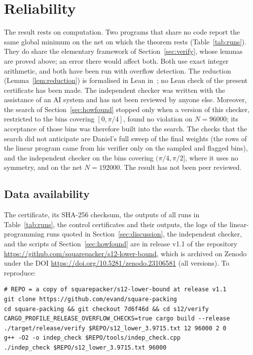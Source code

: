\documentclass[11pt]{amsart}
\theoremstyle{definition}
\theoremstyle{remark}
\begin{document}
\section{Reliability}\label{sec:reliability}

The result rests on computation. Two programs that share no code report the same global minimum on the net on which the theorem rests (Table~\ref{tab:runs}). They do share the elementary framework of Section~\ref{sec:verify}, whose lemmas are proved above; an error there would affect both. Both use exact integer arithmetic, and both have been run with overflow detection. The reduction (Lemma~\ref{lem:reduction}) is formalised in Lean in~\cite{Dan26}; no Lean check of the present certificate has been made. The independent checker was written with the assistance of an AI system and has not been reviewed by anyone else. Moreover, the search of Section~\ref{sec:howfound} stopped only when a version of this checker, restricted to the bins covering $[0,\pi/4]$, found no violation on $N=96000$; its acceptance of those bins was therefore built into the search. The checks that the search did not anticipate are Daniel's full sweep of the final weights (the rows of the linear program came from his verifier only on the sampled and flagged bins), and the independent checker on the bins covering $(\pi/4,\pi/2]$, where it uses no symmetry, and on the net $N=192000$. The result has not been peer reviewed.

\subsection*{Data availability}
The certificate, its SHA-256 checksum, the outputs of all runs in Table~\ref{tab:runs}, the control certificates and their outputs, the logs of the linear-programming runs quoted in Section~\ref{sec:discussion}, the independent checker, and the scripts of Section~\ref{sec:howfound} are in release v1.1 of the repository \url{https://github.com/squarepacker/s12-lower-bound}, which is archived on Zenodo under the DOI \url{https://doi.org/10.5281/zenodo.23106581} (all versions).
To reproduce:
\begin{verbatim}
# REPO = a copy of squarepacker/s12-lower-bound at release v1.1
git clone https://github.com/evand/square-packing
cd square-packing && git checkout 7d6f46d && cd s12/verify
CARGO_PROFILE_RELEASE_OVERFLOW_CHECKS=true cargo build --release
./target/release/verify $REPO/s12_lower_3.9715.txt 12 96000 2 0
g++ -O2 -o indep_check $REPO/tools/indep_check.cpp
./indep_check $REPO/s12_lower_3.9715.txt 96000
\end{verbatim}
\end{document}
